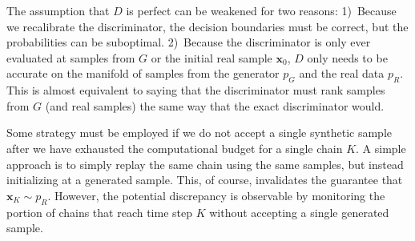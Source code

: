 \documentclass{article}
\renewcommand{\vec}[1]{{\boldsymbol{\mathbf{#1}}}} %
\newcommand{\sample}{\sim}
\newcommand{\PG}{{p_G}}
\newcommand{\PR}{{p_R}}
\begin{document}

The assumption that $D$ is perfect can be weakened for two reasons:
1)~Because we recalibrate the discriminator, the decision boundaries must be correct, but the probabilities can be suboptimal.
2)~Because the discriminator is only ever evaluated at samples from $G$ or the initial real sample $\vec x_0$, $D$ only needs to be accurate on the manifold of samples from the generator $\PG$ and the real data $\PR$.
This is almost equivalent to saying that the discriminator must rank samples from $G$ (and real samples) the same way that the exact discriminator would.

Some strategy must be employed if we do not accept a single synthetic sample after we have exhausted the computational budget for a single chain $K$.
A simple approach is to simply replay the same chain using the same samples, but instead initializing at a generated sample.
This, of course, invalidates the guarantee that $\vec x_K \sample \PR$.
However, the potential discrepancy is observable by monitoring the portion of chains that reach time step $K$ without accepting a single generated sample.

\end{document}
